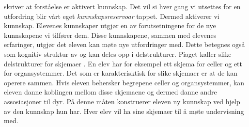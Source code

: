 \documentclass[main.tex]{subfiles}
\begin{document}
 skriver at forståelse er aktivert kunnskap. Det vil si hver gang vi utsettes for en utfordring blir vårt eget \emph{kunnskapsreservoar}
tappet. Dermed aktiverer vi kunnskap. Elevenes kunnskaper utgjør en av forutsetningene for de nye kunnskapene vi tilfører dem. Disse kunnskapene, sammen med
elevenes erfaringer, utgjør det eleven kan møte nye utfordringer med. Dette betegnes også som kognitiv struktur av \citeauthor{solv92} og kan deles opp i 
delstrukturer. Piaget kaller slike delstrukturer for skjemaer . En elev har for eksempel ett skjema for celler og ett for organsystemmer. 
Det som er karakterisktisk for slike skjemaer er at de kan operere sammen. Hvis eleven behersker begrepene celler og organsystemmer, kan eleven danne koblingen
mellom disse skjemaene og dermed danne andre assosiasjoner til dyr. På denne måten konstruerer eleven ny kunnskap ved hjelp av den kunnskap hun har.
Hver elev vil ha sine skjemaer til å møte undervisning med.



\end{document}
